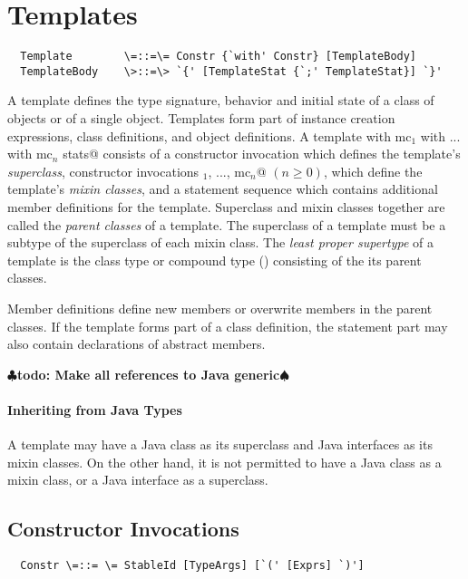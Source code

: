 \documentclass[11pt]{report}
\renewcommand{\todo}[1]{{$\clubsuit$\bf todo: #1$\spadesuit$}}
\begin{document}
\section{Templates}
\label{sec:templates}

\syntax\begin{verbatim}
  Template        \=::=\= Constr {`with' Constr} [TemplateBody]
  TemplateBody    \>::=\> `{' [TemplateStat {`;' TemplateStat}] `}'
\end{verbatim}

A template defines the type signature, behavior and initial state of a
class of objects or of a single object. Templates form part of
instance creation expressions, class definitions, and object
definitions.  A template
\verb@sc with mc$_1$ with ... with mc$_n$ {stats}@ consists of a
constructor invocation \verb@sc@ which defines the template's {\em
superclass}, constructor invocations \verb@mc$_1$, ..., mc$_n$@
$(n \geq 0)$, which define the template's {\em mixin classes}, and a
statement sequence \verb@stats@ which contains additional member
definitions for the template.  Superclass and mixin classes together
are called the {\em parent classes} of a template.  The superclass of
a template must be a subtype of the superclass of each mixin class.
The {\em least proper supertype} of a template is the class type or
compound type () consisting of the its parent classes.

Member definitions define new members or overwrite members in the
parent classes.  If the template forms part of a class definition,
the statement part \verb@stats@ may also contain declarations of abstract members.

\todo{Make all references to Java generic}

\paragraph{Inheriting from Java Types} A template may have a Java class as
its superclass and Java interfaces as its mixin classes. On the other
hand, it is not permitted to have a Java class as a mixin class, or a
Java interface as a superclass.

\subsection{Constructor Invocations}
\label{sec:constr-invoke}
\syntax\begin{verbatim}
  Constr \=::= \= StableId [TypeArgs] [`(' [Exprs] `)']  
\end{verbatim}
\end{document}
